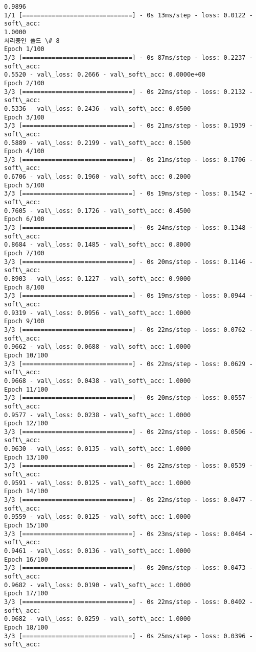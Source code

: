 \documentclass[11pt]{article}
\begin{document}
\begin{Verbatim}[commandchars=\\\{\}]
0.9896
1/1 [==============================] - 0s 13ms/step - loss: 0.0122 - soft\_acc:
1.0000
처리중인 폴드 \# 8
Epoch 1/100
3/3 [==============================] - 0s 87ms/step - loss: 0.2237 - soft\_acc:
0.5520 - val\_loss: 0.2666 - val\_soft\_acc: 0.0000e+00
Epoch 2/100
3/3 [==============================] - 0s 22ms/step - loss: 0.2132 - soft\_acc:
0.5336 - val\_loss: 0.2436 - val\_soft\_acc: 0.0500
Epoch 3/100
3/3 [==============================] - 0s 21ms/step - loss: 0.1939 - soft\_acc:
0.5889 - val\_loss: 0.2199 - val\_soft\_acc: 0.1500
Epoch 4/100
3/3 [==============================] - 0s 21ms/step - loss: 0.1706 - soft\_acc:
0.6706 - val\_loss: 0.1960 - val\_soft\_acc: 0.2000
Epoch 5/100
3/3 [==============================] - 0s 19ms/step - loss: 0.1542 - soft\_acc:
0.7605 - val\_loss: 0.1726 - val\_soft\_acc: 0.4500
Epoch 6/100
3/3 [==============================] - 0s 24ms/step - loss: 0.1348 - soft\_acc:
0.8684 - val\_loss: 0.1485 - val\_soft\_acc: 0.8000
Epoch 7/100
3/3 [==============================] - 0s 20ms/step - loss: 0.1146 - soft\_acc:
0.8903 - val\_loss: 0.1227 - val\_soft\_acc: 0.9000
Epoch 8/100
3/3 [==============================] - 0s 19ms/step - loss: 0.0944 - soft\_acc:
0.9319 - val\_loss: 0.0956 - val\_soft\_acc: 1.0000
Epoch 9/100
3/3 [==============================] - 0s 22ms/step - loss: 0.0762 - soft\_acc:
0.9662 - val\_loss: 0.0688 - val\_soft\_acc: 1.0000
Epoch 10/100
3/3 [==============================] - 0s 22ms/step - loss: 0.0629 - soft\_acc:
0.9668 - val\_loss: 0.0438 - val\_soft\_acc: 1.0000
Epoch 11/100
3/3 [==============================] - 0s 20ms/step - loss: 0.0557 - soft\_acc:
0.9577 - val\_loss: 0.0238 - val\_soft\_acc: 1.0000
Epoch 12/100
3/3 [==============================] - 0s 22ms/step - loss: 0.0506 - soft\_acc:
0.9630 - val\_loss: 0.0135 - val\_soft\_acc: 1.0000
Epoch 13/100
3/3 [==============================] - 0s 22ms/step - loss: 0.0539 - soft\_acc:
0.9591 - val\_loss: 0.0125 - val\_soft\_acc: 1.0000
Epoch 14/100
3/3 [==============================] - 0s 22ms/step - loss: 0.0477 - soft\_acc:
0.9559 - val\_loss: 0.0125 - val\_soft\_acc: 1.0000
Epoch 15/100
3/3 [==============================] - 0s 23ms/step - loss: 0.0464 - soft\_acc:
0.9461 - val\_loss: 0.0136 - val\_soft\_acc: 1.0000
Epoch 16/100
3/3 [==============================] - 0s 20ms/step - loss: 0.0473 - soft\_acc:
0.9682 - val\_loss: 0.0190 - val\_soft\_acc: 1.0000
Epoch 17/100
3/3 [==============================] - 0s 22ms/step - loss: 0.0402 - soft\_acc:
0.9682 - val\_loss: 0.0259 - val\_soft\_acc: 1.0000
Epoch 18/100
3/3 [==============================] - 0s 25ms/step - loss: 0.0396 - soft\_acc:

\end{Verbatim}
\end{document}
